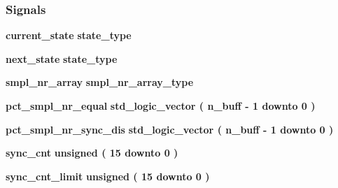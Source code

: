 \subsubsection*{Signals}
 \begin{DoxyCompactItemize}
\item 
{\bf current\+\_\+state} {\bfseries {\bfseries {\bf state\+\_\+type}} \textcolor{vhdlchar}{ }} 
\item 
{\bf next\+\_\+state} {\bfseries {\bfseries {\bf state\+\_\+type}} \textcolor{vhdlchar}{ }} 
\item 
{\bf smpl\+\_\+nr\+\_\+array} {\bfseries {\bfseries {\bf smpl\+\_\+nr\+\_\+array\+\_\+type}} \textcolor{vhdlchar}{ }} 
\item 
{\bf pct\+\_\+smpl\+\_\+nr\+\_\+equal} {\bfseries \textcolor{comment}{std\+\_\+logic\+\_\+vector}\textcolor{vhdlchar}{ }\textcolor{vhdlchar}{(}\textcolor{vhdlchar}{ }\textcolor{vhdlchar}{ }\textcolor{vhdlchar}{ }\textcolor{vhdlchar}{ }{\bfseries {\bf n\+\_\+buff}} \textcolor{vhdlchar}{-\/}\textcolor{vhdlchar}{ } \textcolor{vhdldigit}{1} \textcolor{vhdlchar}{ }\textcolor{keywordflow}{downto}\textcolor{vhdlchar}{ }\textcolor{vhdlchar}{ } \textcolor{vhdldigit}{0} \textcolor{vhdlchar}{ }\textcolor{vhdlchar}{)}\textcolor{vhdlchar}{ }} 
\item 
{\bf pct\+\_\+smpl\+\_\+nr\+\_\+sync\+\_\+dis} {\bfseries \textcolor{comment}{std\+\_\+logic\+\_\+vector}\textcolor{vhdlchar}{ }\textcolor{vhdlchar}{(}\textcolor{vhdlchar}{ }\textcolor{vhdlchar}{ }\textcolor{vhdlchar}{ }\textcolor{vhdlchar}{ }{\bfseries {\bf n\+\_\+buff}} \textcolor{vhdlchar}{-\/}\textcolor{vhdlchar}{ } \textcolor{vhdldigit}{1} \textcolor{vhdlchar}{ }\textcolor{keywordflow}{downto}\textcolor{vhdlchar}{ }\textcolor{vhdlchar}{ } \textcolor{vhdldigit}{0} \textcolor{vhdlchar}{ }\textcolor{vhdlchar}{)}\textcolor{vhdlchar}{ }} 
\item 
{\bf sync\+\_\+cnt} {\bfseries \textcolor{comment}{unsigned}\textcolor{vhdlchar}{ }\textcolor{vhdlchar}{(}\textcolor{vhdlchar}{ }\textcolor{vhdlchar}{ } \textcolor{vhdldigit}{15} \textcolor{vhdlchar}{ }\textcolor{keywordflow}{downto}\textcolor{vhdlchar}{ }\textcolor{vhdlchar}{ } \textcolor{vhdldigit}{0} \textcolor{vhdlchar}{ }\textcolor{vhdlchar}{)}\textcolor{vhdlchar}{ }} 
\item 
{\bf sync\+\_\+cnt\+\_\+limit} {\bfseries \textcolor{comment}{unsigned}\textcolor{vhdlchar}{ }\textcolor{vhdlchar}{(}\textcolor{vhdlchar}{ }\textcolor{vhdlchar}{ } \textcolor{vhdldigit}{15} \textcolor{vhdlchar}{ }\textcolor{keywordflow}{downto}\textcolor{vhdlchar}{ }\textcolor{vhdlchar}{ } \textcolor{vhdldigit}{0} \textcolor{vhdlchar}{ }\textcolor{vhdlchar}{)}\textcolor{vhdlchar}{ }} 

\end{DoxyCompactItemize}

